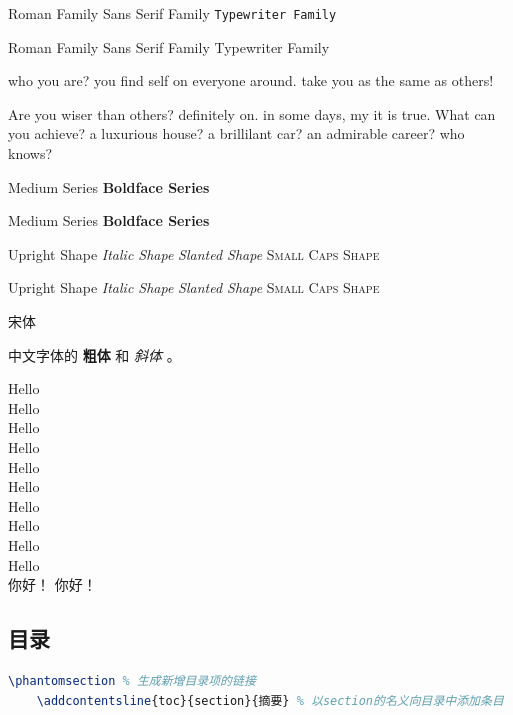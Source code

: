 \textrm{Roman Family} \textsf{Sans Serif Family} \texttt{Typewriter Family}    

{\rmfamily Roman Family} {\sffamily Sans Serif Family} {\ttfamily Typewriter Family}

{\sffamily who you are? you find self on everyone around. take you as the same as others!}

{\ttfamily Are you wiser than others? definitely on. in some days, my it is true. What can you achieve? a luxurious house? a brillilant car? an admirable career? who knows?}

\textmd{Medium Series} \textbf{Boldface Series}

{\mdseries Medium Series} {\bfseries Boldface Series}

\textup{Upright Shape} \textit{Italic Shape} \textsl{Slanted Shape} \textsc{Small Caps Shape}

{\upshape Upright Shape} {\itshape Italic Shape} {\slshape Slanted Shape} {\scshape Small Caps Shape}

{\songti 宋体}   

中文字体的 \textbf{粗体} 和 \textit{斜体} 。


{\tiny           Hello}\\
{\scriptsize     Hello}\\
{\footnotesize   Hello}\\
{\small          Hello}\\
{\normalsize      Hello}\\
{\large          Hello}\\
{\Large          Hello}\\
{\LARGE          Hello}\\
{\huge           Hello}\\
{\Huge           Hello}\\

 你好！
 你好！

\subsection{目录}
\begin{lstlisting}[language={tex}]
    \phantomsection % 生成新增目录项的链接
    \addcontentsline{toc}{section}{摘要} % 以section的名义向目录中添加条目
\end{lstlisting}

